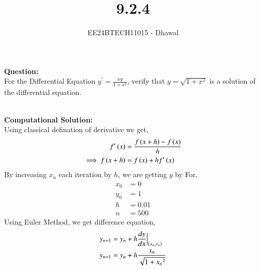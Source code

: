 \documentclass[journal]{IEEEtran}
\begin{document}

\vspace{3cm}

\title{9.2.4}
\author{EE24BTECH11015 - Dhawal}

{\let\newpage\relax\maketitle}

\renewcommand{\thefigure}{\theenumi}
\renewcommand{\thetable}{\theenumi}
\setlength{\intextsep}{10pt} %

\textbf{Question:}\\
For the Differential Equation $y^{\prime}=\frac{xy}{1+x^2}$, verify that $y=\sqrt{1+x^2}$ is a solution of the differential equation.

\\
\textbf{Computational Solution:}\\
Using classical defination of derivative we get,\\
\begin{align}
    f^{\prime}\left(x\right) &= \frac{f\left(x+h\right)-f\left(x\right)}{h}\\
    \implies f\left(x+h\right) &= f\left(x\right) + h f^{\prime}\left(x\right)
\end{align}
By increasing $x_n$ each iteration by $h$, we are getting $y$ by 
For,
\begin{align}
x_0 &= 0\\
y_0 &= 1\\
h &= 0.01\\
n &= 500
\end{align}
Using Euler Method, we get difference equation,
\begin{align}
y_{n+1} &= y_n + h\frac{dy}{dx}\Big|_{\left(x_n,y_n\right)}\\
	y_{n+1} &= y_n + h \frac{x_n}{\sqrt{1+{x_n}^2}}
\end{align}
\end{document}
